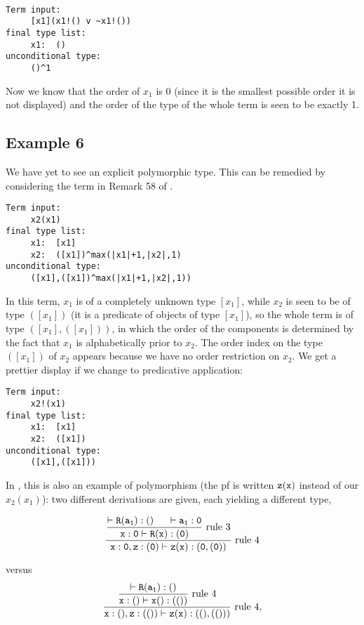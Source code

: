 \documentclass{article}
\begin{document}
\begin{verbatim}

Term input:
     [x1](x1!() v ~x1!())
final type list:
     x1:  ()
unconditional type:
     ()^1
\end{verbatim}

Now we know that the order of $x_1$ is 0 (since it is the smallest possible
order it is not displayed) and the order of the type of the whole term
is seen to be exactly 1.
\subsection{Example 6}
We have yet to see an explicit polymorphic type.  This can be remedied
by considering the term in Remark 58 of \cite{types40}.

\begin{verbatim}
Term input:
     x2(x1)
final type list:
     x1:  [x1]
     x2:  ([x1])^max(|x1|+1,|x2|,1)
unconditional type:
     ([x1],([x1])^max(|x1|+1,|x2|,1))
\end{verbatim}

In this term, $x_1$ is of a completely unknown type $[x_1]$, while
$x_2$ is seen to be of type $([x_1])$ (it is a predicate of objects of
type $[x_1]$), so the whole term is of type $([x_1],([x_1]))$, in
which the order of the components is determined by the fact that $x_1$
is alphabetically prior to $x_2$.  The order index on the type
$([x_1])$ of $x_2$ appears because we have no order restriction on
$x_2$.  We get a prettier display if we change to predicative
application:


\begin{verbatim}
Term input:
     x2!(x1)
final type list:
     x1:  [x1]
     x2:  ([x1])
unconditional type:
     ([x1],([x1]))
\end{verbatim}

In \cite{types40}, this is also an example of polymorphism (the pf is
written $\tt z(x)$ instead of our $x_2(x_1)$): two different
derivations are given, each yielding a different type,

$$\displaystyle\tt\frac{\displaystyle\frac{\tt\vdash R(a_1):()
                            \hspace*{.5cm}
                            \vdash a_1:0}
                           {\tt x:0\vdash R(x):(0)}{\rm \mbox{ rule 3}}}
                {\tt x:0,z:(0)\vdash z(x):(0,(0))}{\rm \mbox{ rule 4}}$$

versus
$$\displaystyle\tt\frac{\displaystyle\frac{\tt\vdash R(a_1):()}
                          {\tt x:()\vdash x():(())}{\rm \mbox{ rule 4}}}
                {x:(),z:(())\vdash z(x):((),(()))}{\rm  \mbox{ rule 4}},$$
\end{document}
